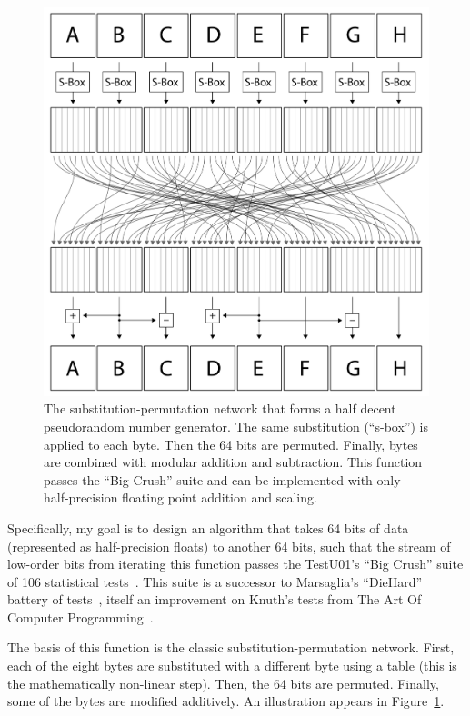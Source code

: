 \documentclass[twocolumn]{article}
\begin{document}
\begin{figure}[tp]
  \begin{center}
    \includegraphics[width=\linewidth]{cipher}
  \end{center}
  \caption{The substitution-permutation network that forms a half decent
    pseudorandom number generator. The same substitution (``s-box'') is
    applied to each byte. Then the 64 bits are permuted. Finally, bytes
    are combined with modular addition and subtraction. This function
    passes the ``Big Crush'' suite and can be implemented with only
    half-precision floating point addition and scaling.
  } \label{fig:cipher}
\end{figure}

Specifically, my goal is to design an algorithm that takes 64 bits of
data (represented as half-precision floats) to another 64 bits, such
that the stream of low-order bits from iterating this function passes
the TestU01's ``Big Crush'' suite of 106 statistical
tests~\cite{lecuyer2007testu01}. This suite is a successor to
Marsaglia's ``DieHard'' battery of tests~\cite{marsaglia1996diehard},
itself an improvement on Knuth's tests from The Art Of Computer
Programming~\cite{knuth1997art}.

The basis of this function is the classic substitution-permutation
network. First, each of the eight bytes are substituted with a
different byte using a table (this is the mathematically non-linear
step). Then, the 64 bits are permuted. Finally, some of the bytes are
modified additively. An illustration appears in Figure~\ref{fig:cipher}.
\end{document}
